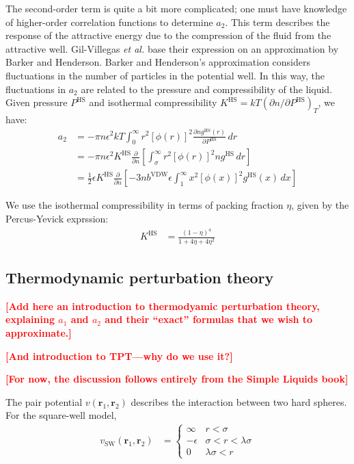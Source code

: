 \documentclass[letterpaper,twocolumn,amsmath,amssymb,prb]{revtex4-1}
\newcommand{\1}{\ensuremath{\textbf{r}_1}}
\newcommand{\2}{\ensuremath{\textbf{r}_2}}
\newcommand{\fixme}[1]{\textcolor{red}{\textbf{[#1]}}}
\begin{document}
The second-order term is quite a bit more complicated; one must have knowledge of higher-order correlation functions to determine $a_2$. This term describes the response of the attractive energy due to the compression of the fluid from the attractive well. Gil-Villegas \emph{et al.} base their expression on an approximation by Barker and Henderson.\cite{Barker67} Barker and Henderson's approximation considers fluctuations in the number of particles in the potential well. In this way, the fluctuations in $a_2$ are related to the pressure and compressibility of the liquid. Given pressure $P^\text{HS}$ and isothermal compressibility $K^\text{HS} = kT\left(\partial n  /\partial P^\text{HS}\right)_T$, we have:
\begin{align}
  a_2 &= -\pi n \epsilon^2kT\int_0^\infty r^2\left[\phi(r)\right]^2\frac{\partial n  g^\text{HS}(r)}{\partial P^\text{HS}}\,dr \\
  &= -\pi n \epsilon^2K^\text{HS}\frac{\partial}{\partial n }\left[\int_\sigma^\infty r^2\left[\phi(r)\right]^2 n  g^\text{HS}\,dr\right] \\
  &= \frac{1}{2}\epsilon K^\text{HS}\frac{\partial}{\partial n }\left[-3 n  b^\text{VDW}\epsilon\int_1^\infty x^2\left[\phi(x)\right]^2 g^\text{HS}(x)\,dx \right]
\end{align}

We use the isothermal compressibility in terms of packing fraction $\eta$, given by the Percus-Yevick exprssion:\cite{Barker76}
\begin{align}
  K^\text{HS} &= \frac{\left(1 - \eta\right)^4}{1 + 4\eta + 4\eta^2}
\end{align}

\subsection{Thermodynamic perturbation theory}\label{subsec:TPT}
\fixme{Add here an introduction to thermodyamic perturbation theory,
  explaining $a_1$ and $a_2$ and their ``exact'' formulas that we wish
  to approximate.}

\fixme{And introduction to TPT---why do we use it?}

\fixme{For now, the discussion follows entirely from the Simple Liquids book\cite{Hansen06}}

The pair potential $v(\1,\2)$ describes the interaction between two hard spheres. For the square-well model,
\begin{align}
  v_\text{SW}(\1,\2) &=
    \begin{cases}
      \infty & r < \sigma \\
      -\epsilon & \sigma < r < \lambda\sigma \\
      0 & \lambda\sigma < r
    \end{cases}
\end{align}
\end{document}
